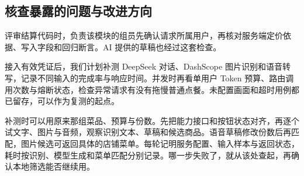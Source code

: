 \subsection{核查暴露的问题与改进方向}

评审结算代码时，负责该模块的组员先确认请求所属用户，再核对服务端定价依据、写入字段和回归断言。AI 提供的草稿也经过这套检查。

接入有效凭证后，我们计划补测 DeepSeek 对话、DashScope 图片识别和语音转写，记录不同输入的完成率与响应时间。并发时再看单用户 Token 预算、路由调用次数与熔断状态，检查异常请求有没有拖慢普通点餐。未配置画面和超时用例都已留存，可以作为复测的起点。

补测时可以用原来那组菜品、预算与份数。先把能力接口和按钮状态对齐，再逐个试文字、图片与音频，观察识别文本、草稿和候选商品。语音草稿修改份数后再匹配，图片候选可返回具体的店铺菜单。每轮记明服务配置、输入样本与返回状态，耗时按识别、模型生成和菜单匹配分别记录。哪一步失败了，就从该处查起，再确认本地筛选能否继续用。
